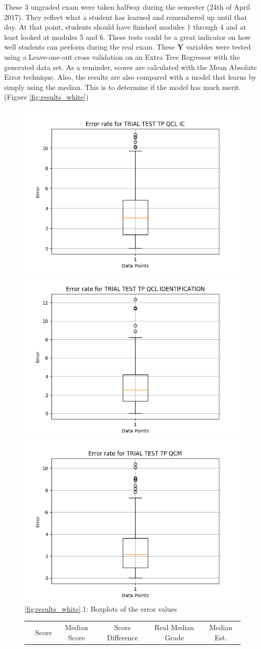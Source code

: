 \documentclass[a4paper,11pt]{report}
\numberwithin{figure}{section} %
\begin{document}
    These 3 ungraded exam were taken halfway during the semester (24th of April 2017).
    They reflect what a student has learned and remembered up until that day.
    At that point, students should have finished modules 1 through 4 and at least looked at modules 5 and 6.
    These tests could be a great indicator on how well students can perform during the real exam.
    These \textbf{Y} variables were tested using a Leave-one-out cross validation on an Extra Tree Regressor with the generated data set.
    As a reminder, scores are calculated with the Mean Absolute Error technique.
    Also, the results are also compared with a model that learns by simply using the median.
    This is to determine if the model has much merit. (Figure \ref{fig:results_white})
    \begin{figure}[H]
      \centering
  	  \includegraphics[width=.3\linewidth]{plots/cv_boxplot_TRIAL_TEST_TP_QCL_IC_2018-04-27_14_35_12.png}
  	  \includegraphics[width=.3\linewidth]{plots/cv_boxplot_TRIAL_TEST_TP_QCL_IDENTIFICATION_2018-04-27_14_31_56.png}
      \includegraphics[width=.3\linewidth]{plots/cv_boxplot_TRIAL_TEST_TP_QCM_2018-04-27_17_16_59.png}
      \\
      \ref{fig:results_white}.1: Boxplots of the error values
      \\
      \vspace{0.5cm}
      \begin{tabular}{| l | c | c | c | c | c |}
      \hline
      & \tiny{Score} & \tiny{Median Score} & \tiny{Score Difference} & \tiny{Real Median Grade} & \tiny{Median Est.
}
\end{tabular}
\end{figure}
\end{document}
